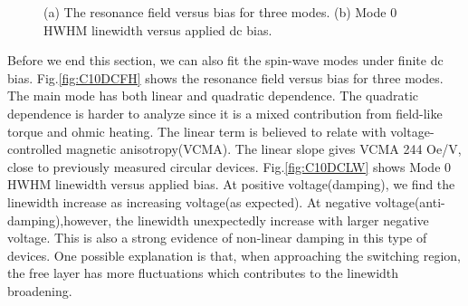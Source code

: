 \begin{figure}[!ht]
\centering
{}
\caption{(a) The resonance field versus bias for three modes. (b) Mode 0 HWHM linewidth versus applied dc bias.}
\end{figure}

Before we end this section, we can also fit the spin-wave modes under finite dc bias. Fig.\ref{fig:C10DCFH} shows the resonance field versus bias for three modes. The main mode has both linear and quadratic dependence. The quadratic dependence is harder to analyze since it is a mixed contribution from field-like torque and ohmic heating. The linear term is believed to relate with voltage-controlled magnetic anisotropy(VCMA). The linear slope gives VCMA 244 Oe/V, close to previously measured circular devices. Fig.\ref{fig:C10DCLW} shows Mode 0 HWHM linewidth versus applied bias. At positive voltage(damping), we find the linewidth increase as increasing voltage(as expected). At negative voltage(anti-damping),however, the linewidth unexpectedly increase with larger negative voltage. This is also a strong evidence of non-linear damping in this type of devices. One possible explanation is that, when approaching the switching region, the free layer has more fluctuations which contributes to the linewidth broadening.



